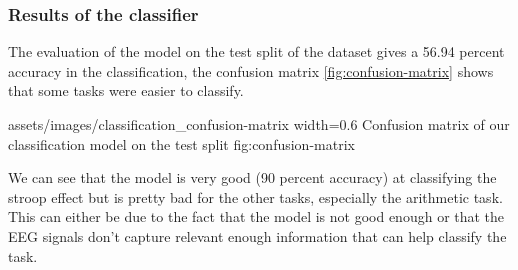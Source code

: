 \subsubsection{Results of the classifier}

The evaluation of the model on the test split of the dataset gives a 56.94
percent accuracy in the classification, the confusion matrix
\cref{fig:confusion-matrix} shows that some tasks were easier to classify.

\insertfigure
    {assets/images/classification_confusion-matrix}
    {width=0.6\textwidth}
    {Confusion matrix of our classification model on the test split}
    {fig:confusion-matrix}

We can see that the model is very good (90 percent accuracy) at classifying the
stroop effect but is pretty bad for the other tasks, especially the arithmetic
task. This can either be due to the fact that the model is not good enough or
that the EEG signals don't capture relevant enough information that can help
classify the task.
